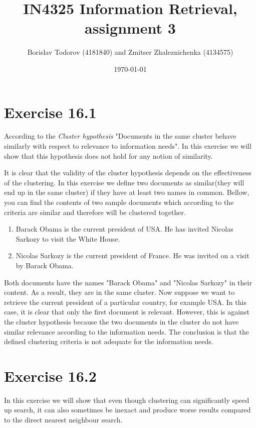 \documentclass[a4paper, notitlepage]{article}
\begin{document}
\title{IN4325 Information Retrieval, assignment 3}
\author{Borislav Todorov (4181840) and Zmitser Zhaleznichenka (4134575)}
\date{\today}
\maketitle

\section{Exercise 16.1}

According to the \emph{Cluster hypothesis} "Documents in the same cluster behave similarly with respect to relevance to information needs". In this exercise we will show that this hypothesis does not hold for any notion of similarity.

It is clear that the validity of the cluster hypothesis depends on the effectiveness of the clustering. In this exercise we define two documents as similar(they will end up in the same cluster) if they have at least two names in common. Bellow, you can find the contents of two sample documents which according to the criteria are similar and therefore will be clustered together.

\begin{enumerate}
	\item Barack Obama is the current president of USA. He has invited Nicolas Sarkozy to visit the White House.
	\item Nicolas Sarkozy is the current president of France. He was invited on a visit by Barack Obama.
\end{enumerate}

Both documents have the names "Barack Obama" and "Nicolas Sarkozy" in their content. As a result, they are in the same cluster. Now suppose we want to retrieve the current president of a particular country, for example USA. In this case, it is clear that only the first document is relevant. However, this is against the cluster hypothesis because the two documents in the cluster do not have similar relevance according to the information needs. The conclusion is that the defined clustering criteria is not adequate for the information needs.

\section{Exercise 16.2}

In this exercise we will show that even though clustering can significantly speed up search, it can also sometimes be inexact and produce worse results compared to the direct nearest neighbour search. 
\end{document}
